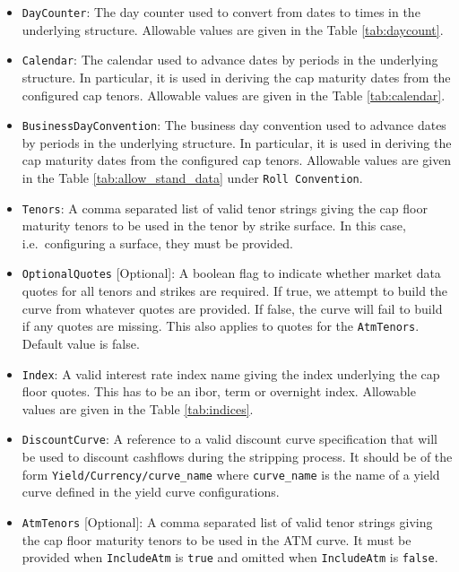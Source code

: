 \begin{itemize}
\item \lstinline!DayCounter!:
The day counter used to convert from dates to times in the underlying structure. Allowable values are given in the Table \ref{tab:daycount}.

\item \lstinline!Calendar!:
The calendar used to advance dates by periods in the underlying structure. In particular, it is used in deriving the cap maturity dates from the configured cap tenors. Allowable values are given in the Table \ref{tab:calendar}.

\item \lstinline!BusinessDayConvention!:
The business day convention used to advance dates by periods in the underlying structure. In particular, it is used in deriving the cap maturity dates from the configured cap tenors. Allowable values are given in the Table \ref{tab:allow_stand_data} under \lstinline!Roll Convention!.

\item \lstinline!Tenors!:
A comma separated list of valid tenor strings giving the cap floor maturity tenors to be used in the tenor by strike surface. In this case, i.e.\ configuring a surface, they must be provided.

\item \lstinline!OptionalQuotes! [Optional]:
A boolean flag to indicate whether market data quotes for all tenors and strikes are required. If true, we attempt to build the curve from whatever quotes are provided. If false, the curve will fail to build if any quotes are missing. This also applies to quotes for the \lstinline!AtmTenors!. Default value is false.

\item \lstinline!Index!:
A valid interest rate index name giving the index underlying the cap floor quotes. This has to be an ibor, term or overnight index. Allowable values are given in the Table \ref{tab:indices}.

\item \lstinline!DiscountCurve!:
A reference to a valid discount curve specification that will be used to discount cashflows during the stripping process. It should be of the form \lstinline!Yield/Currency/curve_name! where \lstinline!curve_name! is the name of a yield curve defined in the yield curve configurations.

\item \lstinline!AtmTenors! [Optional]:
A comma separated list of valid tenor strings giving the cap floor maturity tenors to be used in the ATM curve. It must be provided when \lstinline!IncludeAtm! is \lstinline!true! and omitted when \lstinline!IncludeAtm! is \lstinline!false!.


\end{itemize}
